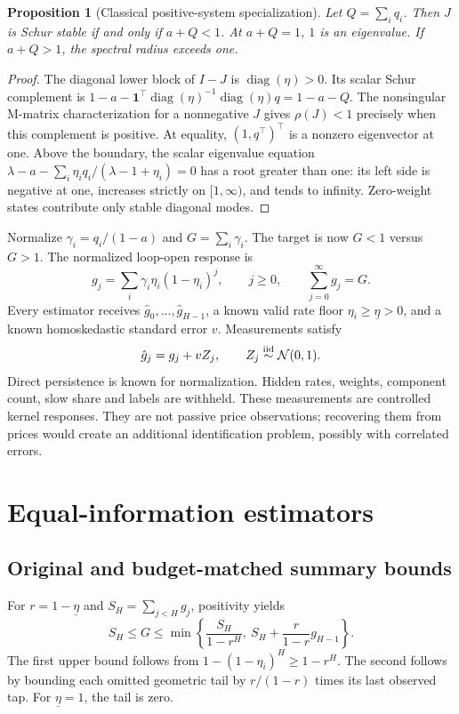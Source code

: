 \documentclass[11pt]{article}
\newtheorem{proposition}{Proposition}[section]
\theoremstyle{remark}\newtheorem{remark}[proposition]{Remark}
\begin{document}
\begin{proposition}[Classical positive-system specialization]\label{prop:stability}
Let $Q=\sum_iq_i$. Then $J$ is Schur stable if and only if $a+Q<1$. At $a+Q=1$, $1$ is an eigenvalue. If $a+Q>1$, the spectral radius exceeds one.
\end{proposition}
\begin{proof}
The diagonal lower block of $I-J$ is $\operatorname{diag}(\eta)>0$. Its scalar Schur complement is $1-a-\mathbf1^\top\operatorname{diag}(\eta)^{-1}\operatorname{diag}(\eta)q=1-a-Q$. The nonsingular M-matrix characterization for a nonnegative $J$ gives $\rho(J)<1$ precisely when this complement is positive. At equality, $(1,q^\top)^\top$ is a nonzero eigenvector at one. Above the boundary, the scalar eigenvalue equation
$\lambda-a-\sum_i\eta_iq_i/(\lambda-1+\eta_i)=0$
has a root greater than one: its left side is negative at one, increases strictly on $[1,\infty)$, and tends to infinity. Zero-weight states contribute only stable diagonal modes.
\end{proof}

Normalize $\gamma_i=q_i/(1-a)$ and $G=\sum_i\gamma_i$. The target is now $G<1$ versus $G>1$. The normalized loop-open response is
\begin{equation}
 g_j=\sum_i\gamma_i\eta_i(1-\eta_i)^j,\qquad j\ge0,\qquad\sum_{j=0}^\infty g_j=G.\label{eq:kernel}
\end{equation}
Every estimator receives $\hat g_0,\ldots,\hat g_{H-1}$, a known valid rate floor $\eta_i\ge\underline\eta>0$, and a known homoskedastic standard error $v$. Measurements satisfy
\begin{equation}
 \hat g_j=g_j+vZ_j,\qquad Z_j\overset{\mathrm{iid}}\sim\mathcal N(0,1).\label{eq:measurement}
\end{equation}
Direct persistence is known for normalization. Hidden rates, weights, component count, slow share and labels are withheld. These measurements are controlled kernel responses. They are not passive price observations; recovering them from prices would create an additional identification problem, possibly with correlated errors.

\section{Equal-information estimators}\label{sec:methods}
\subsection{Original and budget-matched summary bounds}
For $r=1-\underline\eta$ and $S_H=\sum_{j<H}g_j$, positivity yields
\begin{equation}
 S_H\le G\le\min\left\{\frac{S_H}{1-r^H},\ S_H+\frac{r}{1-r}g_{H-1}\right\}.\label{eq:summary}
\end{equation}
The first upper bound follows from $1-(1-\eta_i)^H\ge1-r^H$. The second follows by bounding each omitted geometric tail by $r/(1-r)$ times its last observed tap. For $\underline\eta=1$, the tail is zero.
\end{document}

